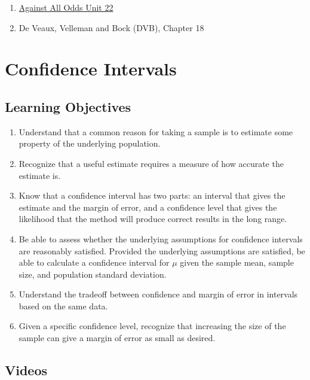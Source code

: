 \documentclass[letterpaper,12pt,twoside,]{pinp}
\providecommand{\tightlist}{%
  \setlength{\itemsep}{0pt}\setlength{\parskip}{0pt}}
\begin{document}
\begin{enumerate}
\item \href{https://www.learner.org/wp-content/uploads/2019/03/AgainstAllOdds_StudentGuide_Unit22-Sampling-Distributions.pdf}{Against All Odds Unit 22}
\item De Veaux, Velleman and Bock (DVB), Chapter 18
\end{enumerate}

\hypertarget{confidence-intervals}{%
\section{Confidence Intervals}\label{confidence-intervals}}

\hypertarget{learning-objectives-3}{%
\subsection{Learning Objectives}\label{learning-objectives-3}}

\begin{enumerate}
\def\labelenumi{\arabic{enumi}.}
\tightlist
\item
  Understand that a common reason for taking a sample is to estimate
  some property of the underlying population.
\item
  Recognize that a useful estimate requires a measure of how accurate
  the estimate is.
\item
  Know that a confidence interval has two parts: an interval that gives
  the estimate and the margin of error, and a confidence level that
  gives the likelihood that the method will produce correct results in
  the long range.
\item
  Be able to assess whether the underlying assumptions for confidence
  intervals are reasonably satisfied. Provided the underlying
  assumptions are satisfied, be able to calculate a confidence interval
  for \(\mu\) given the sample mean, sample size, and population
  standard deviation.
\item
  Understand the tradeoff between confidence and margin of error in
  intervals based on the same data.
\item
  Given a specific confidence level, recognize that increasing the size
  of the sample can give a margin of error as small as desired.
\end{enumerate}

\hypertarget{videos-2}{%
\subsection{Videos}\label{videos-2}}
\end{document}
